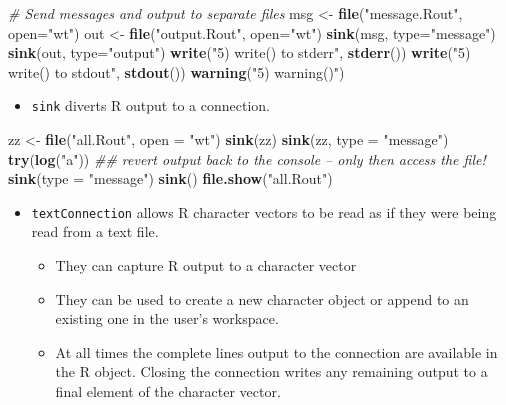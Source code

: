 \documentclass[]{book}
\newenvironment{Shaded}{\begin{snugshade}}{\end{snugshade}}
\newcommand{\CommentTok}[1]{\textcolor[rgb]{0.56,0.35,0.01}{\textit{#1}}}
\newcommand{\DataTypeTok}[1]{\textcolor[rgb]{0.13,0.29,0.53}{#1}}
\newcommand{\KeywordTok}[1]{\textcolor[rgb]{0.13,0.29,0.53}{\textbf{#1}}}
\newcommand{\NormalTok}[1]{#1}
\newcommand{\StringTok}[1]{\textcolor[rgb]{0.31,0.60,0.02}{#1}}
\providecommand{\tightlist}{%
  \setlength{\itemsep}{0pt}\setlength{\parskip}{0pt}}
\begin{document}
\begin{Shaded}
\begin{Highlighting}[]
\CommentTok{# Send messages and output to separate files}
\NormalTok{msg <-}\StringTok{ }\KeywordTok{file}\NormalTok{(}\StringTok{"message.Rout"}\NormalTok{, }\DataTypeTok{open=}\StringTok{"wt"}\NormalTok{)}
\NormalTok{out <-}\StringTok{ }\KeywordTok{file}\NormalTok{(}\StringTok{"output.Rout"}\NormalTok{, }\DataTypeTok{open=}\StringTok{"wt"}\NormalTok{)}
\KeywordTok{sink}\NormalTok{(msg, }\DataTypeTok{type=}\StringTok{"message"}\NormalTok{)}
\KeywordTok{sink}\NormalTok{(out, }\DataTypeTok{type=}\StringTok{"output"}\NormalTok{)}
\KeywordTok{write}\NormalTok{(}\StringTok{"5) write() to stderr"}\NormalTok{, }\KeywordTok{stderr}\NormalTok{())}
\KeywordTok{write}\NormalTok{(}\StringTok{"5) write() to stdout"}\NormalTok{, }\KeywordTok{stdout}\NormalTok{())}
\KeywordTok{warning}\NormalTok{(}\StringTok{"5) warning()"}\NormalTok{)}
\end{Highlighting}
\end{Shaded}

\begin{itemize}
\tightlist
\item
  \texttt{sink} diverts R output to a connection.
\end{itemize}

\begin{Shaded}
\begin{Highlighting}[]
\NormalTok{zz <-}\StringTok{ }\KeywordTok{file}\NormalTok{(}\StringTok{"all.Rout"}\NormalTok{, }\DataTypeTok{open =} \StringTok{"wt"}\NormalTok{)}
\KeywordTok{sink}\NormalTok{(zz)}
\KeywordTok{sink}\NormalTok{(zz, }\DataTypeTok{type =} \StringTok{"message"}\NormalTok{)}
\KeywordTok{try}\NormalTok{(}\KeywordTok{log}\NormalTok{(}\StringTok{"a"}\NormalTok{))}
\CommentTok{## revert output back to the console -- only then access the file!}
\KeywordTok{sink}\NormalTok{(}\DataTypeTok{type =} \StringTok{"message"}\NormalTok{)}
\KeywordTok{sink}\NormalTok{()}
\KeywordTok{file.show}\NormalTok{(}\StringTok{"all.Rout"}\NormalTok{)}
\end{Highlighting}
\end{Shaded}

\begin{itemize}
\tightlist
\item
  \texttt{textConnection} allows R character vectors to be read as if they were being read from a text file.

  \begin{itemize}
  \tightlist
  \item
    They can capture R output to a character vector
  \item
    They can be used to create a new character object or append to an existing one in the user's workspace.
  \item
    At all times the complete lines output to the connection are available in the R object. Closing the connection writes any remaining output to a final element of the character vector.
  \end{itemize}
\end{itemize}
\end{document}
